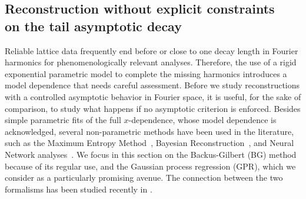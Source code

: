 \documentclass[aps,prl,groupedaddress,twocolumn,superscriptaddress,amsfonts,amssymb,amsmath,showpacs,floatfix,preprintnumbers]{revtex4-2}
\begin{document}
\subsection{Reconstruction without explicit constraints\\on the tail asymptotic decay}

Reliable lattice data frequently end before or close to one decay length in Fourier harmonics for phenomenologically relevant analyses. Therefore, the use of a rigid exponential parametric model to complete the missing harmonics introduces a model dependence that needs careful assessment. Before we study reconstructions with a controlled asymptotic behavior in Fourier space, it is useful, for the sake of comparison, to study what happens if no asymptotic criterion is enforced. Besides simple parametric fits of the full $x$-dependence, whose model dependence is acknowledged, several non-parametric methods have been used in the literature, such as the Maximum Entropy Method~\cite{mem_ref}, Bayesian Reconstruction~\cite{Burnier:2013nla, Liang:2019frk}, and Neural Network analyses~\cite{Karpie:2019eiq,Cichy:2019ebf,DelDebbio:2020rgv,Khan:2022vot,Chowdhury:2024ymm}. We focus in this section on the Backus-Gilbert (BG) \cite{BG} method because of its regular use, and the Gaussian process regression (GPR), which we consider as a particularly promising avenue. The connection between the two formalisms has been studied recently in \cite{DelDebbio:2024lwm}.
\end{document}
